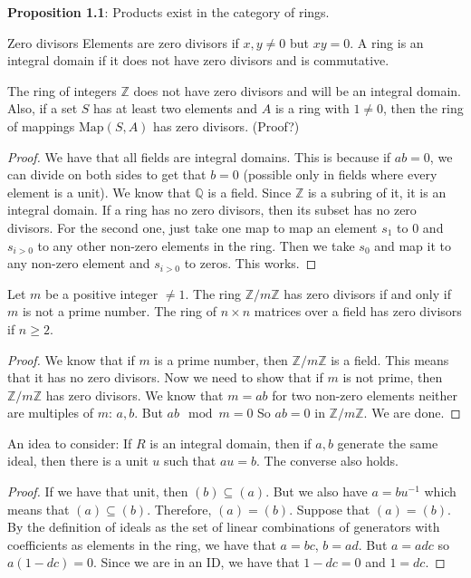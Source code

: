 \documentclass{report}
\begin{document}
\textbf{Proposition 1.1}: Products exist in the category of rings.

\begin{definition}{Zero divisors}
    Elements are zero divisors if $x, y \neq 0$ but $xy = 0$. A ring is an integral domain if it does not have zero divisors and is commutative.
\end{definition}

\begin{examples}
    \begin{example}
        The ring of integers $\mathbb{Z}$ does not have zero divisors and will be an integral domain. Also, if a set $S$ has at least two elements and $A$ is a ring with $1 \neq 0$, then the ring of mappings $\text{Map}(S, A)$ has zero divisors. (Proof?)
            \begin{proof}
                We have that all fields are integral domains. This is because if $ab = 0$, we can divide on both sides to get that $b = 0$ (possible only in fields where every element is a unit). We know that $\mathbb{Q}$ is a field. Since $\mathbb{Z}$ is a subring of it, it is an integral domain. If a ring has no zero divisors, then its subset has no zero divisors. For the second one, just take one map to map an element $s_{1}$ to 0 and $s_{i > 0}$ to any other non-zero elements in the ring. Then we take $s_{0}$ and map it to any non-zero element and $s_{i > 0}$ to zeros. This works.
            \end{proof}
    \end{example}

    \begin{example}
        Let $m$ be a positive integer $\neq 1$. The ring $\mathbb{Z}/m\mathbb{Z}$ has zero divisors if and only if $m$ is not a prime number. The ring of $n \times n$ matrices over a field has zero divisors if $n \geq 2$.
            \begin{proof}
                We know that if $m$ is a prime number, then $\mathbb{Z}/m\mathbb{Z}$ is a field. This means that it has no zero divisors. Now we need to show that if $m$ is not prime, then $\mathbb{Z}/m\mathbb{Z}$ has zero divisors. We know that $m = ab$ for two non-zero elements neither are multiples of $m$: $a, b$. But $ab \mod{m} = 0$ So $ab = 0$ in $\mathbb{Z}/m\mathbb{Z}$. We are done.
            \end{proof}
    \end{example}
\end{examples}

An idea to consider: If $R$ is an integral domain, then if $a, b$ generate the same ideal, then there is a unit $u$ such that $au = b$. The converse also holds.
    \begin{proof}
        If we have that unit, then $(b) \subseteq (a)$. But we also have $a = bu^{-1}$ which means that $(a) \subseteq (b)$. Therefore, $(a) = (b)$. Suppose that $(a) = (b)$. By the definition of ideals as the set of linear combinations of generators with coefficients as elements in the ring, we have that $a = bc$, $b = ad$. But $a = adc$ so $a(1 - dc) = 0$. Since we are in an ID, we have that $1 - dc = 0$ and $1 = dc$.
    \end{proof}
\end{document}
